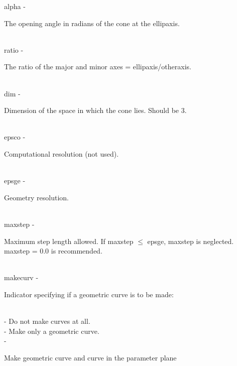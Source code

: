         \>\>    {\fov alpha}\> - \>     \begin{minipg2}
                                The opening angle in radians of the cone at the ellipaxis.
                                \end{minipg2}\\[0.3ex]
        \>\>    {\fov ratio}\> - \>     \begin{minipg2}
                                The ratio of the major and minor
                                axes = ellipaxis/otheraxis.
                                \end{minipg2}\\[0.3ex]
        \>\>    {\fov dim}\> - \>       \begin{minipg2}
                                Dimension of the space in which the cone lies.
                                Should be 3.
                                \end{minipg2}\\[0.8ex]
        \>\>    {\fov epsco}\> - \>     \begin{minipg2}
                                Computational resolution (not used).
                                \end{minipg2}\\
        \>\>    {\fov epsge}\> - \>     \begin{minipg2}
                                Geometry resolution.
                                \end{minipg2}\\
        \>\>    {\fov maxstep}\> - \>   \begin{minipg2}
                                Maximum step length allowed. If maxstep $\leq$ epsge,
                                maxstep is neglected. maxstep = 0.0 is recommended.
                                \end{minipg2}\\[0.3ex]
        \>\>    {\fov makecurv}\> - \>          \begin{minipg2}
                                Indicator specifying if a geometric curve is to be made:
                                \end{minipg2}\\
                \>\>\>\> -     \>Do not make curves at all.\\
                \>\>\>\> -     \>Make only a geometric curve.\\
                \>\>\>\> -     \>\begin{minipg5}
                                        Make geometric curve and curve in the parameter
                                        plane
                                        \end{minipg5} \\[0.3ex]

